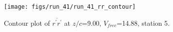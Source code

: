 \begin{figure}[H]
\centering
\texttt{[image: figs/run\_41/run\_41\_rr\_contour]}
\caption{Contour plot of $\overline{r^\prime r^\prime}$ at $z/c$=9.00, $V_{free}$=14.88, station 5.}
\label{fig:run_41_rr_contour}
\end{figure}


